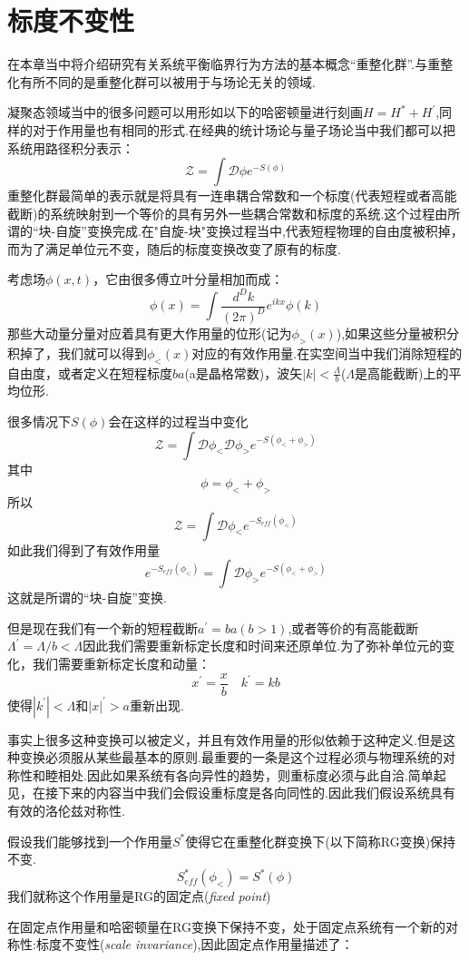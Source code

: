 \documentclass{ctexart}
\begin{document}
\section{标度不变性}
在本章当中将介绍研究有关系统平衡临界行为方法的基本概念“重整化群”.与重整化有所不同的是重整化群可以被用于与场论无关的领域.\par 
凝聚态领域当中的很多问题可以用形如以下的哈密顿量进行刻画$H=H^{*}+H^\prime$,同样的对于作用量也有相同的形式.在经典的统计场论与量子场论当中我们都可以把系统用路径积分表示：
$$\mathcal{Z}=\int \mathcal{D}\phi e^{-S(\phi)}$$
重整化群最简单的表示就是将具有一连串耦合常数和一个标度(代表短程或者高能截断)的系统映射到一个等价的具有另外一些耦合常数和标度的系统.这个过程由所谓的“块-自旋”变换完成.在"自旋-块"变换过程当中,代表短程物理的自由度被积掉，而为了满足单位元不变，随后的标度变换改变了原有的标度.\par 
考虑场$\phi(x,t)$，它由很多傅立叶分量相加而成：
$$\phi(x)=\int\frac{d^Dk}{(2\pi)^D}e^{ikx}\phi(k)$$
那些大动量分量对应着具有更大作用量的位形(记为$\phi_{>}(x)$),如果这些分量被积分积掉了，我们就可以得到$\phi_{<}(x)$对应的有效作用量.在实空间当中我们消除短程的自由度，或者定义在短程标度$ba$(a是晶格常数)，波矢$|k|<\frac{\Lambda}{b}$($\Lambda$是高能截断)上的平均位形.\par 
很多情况下$S(\phi)$会在这样的过程当中变化
$$\mathcal{Z}=\int\mathcal{D}\phi_{<}\mathcal{D}\phi_{>}e^{-S(\phi_{<}+\phi_{>})}$$
其中$$\phi=\phi_{<}+\phi_{>}$$
所以$$\mathcal{Z}=\int\mathcal{D}\phi_{<}e^{-S_{eff}(\phi_{<})}$$
如此我们得到了有效作用量
$$e^{-S_{eff}(\phi_{<})}=\int\mathcal{D}\phi_{>}e^{-S(\phi_{<}+\phi_{>})}$$
这就是所谓的“块-自旋”变换.\par 
但是现在我们有一个新的短程截断$a^\prime=ba(b>1)$,或者等价的有高能截断$\Lambda^\prime=\Lambda/b<\Lambda$因此我们需要重新标定长度和时间来还原单位.为了弥补单位元的变化，我们需要重新标定长度和动量：
$$x^\prime=\frac{x}{b}\quad k^\prime=kb$$
使得$|k^\prime|<\Lambda$和$|x|^\prime>a$重新出现.\par 
事实上很多这种变换可以被定义，并且有效作用量的形似依赖于这种定义.但是这种变换必须服从某些最基本的原则.最重要的一条是这个过程必须与物理系统的对称性和睦相处.因此如果系统有各向异性的趋势，则重标度必须与此自洽.简单起见，在接下来的内容当中我们会假设重标度是各向同性的.因此我们假设系统具有有效的洛伦兹对称性.\par 
假设我们能够找到一个作用量$S^*$使得它在重整化群变换下(以下简称RG变换)保持不变.
$$S^*_{eff}(\phi_{<})=S^*(\phi)$$
我们就称这个作用量是RG的固定点(\textit{fixed point})\par 
在固定点作用量和哈密顿量在RG变换下保持不变，处于固定点系统有一个新的对称性:标度不变性(\textit{scale invariance}),因此固定点作用量描述了：
\end{document}
